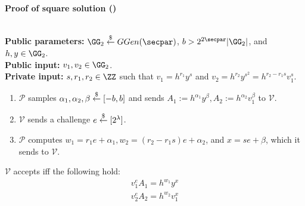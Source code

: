     \begin{mdframed}
    \begin{center}
        \textbf{Proof of square solution (\zkposqs)}
    \end{center}
    \hfill\\
    \textbf{Public parameters:} $\GG_2 \sample GGen(\secpar)$, $b > 2^{2\secpar}\sizeof{\GG_2}$, and $h,y \in \GG_2$. \hfill\\
    \textbf{Public input:} $v_1, v_2 \in \GG_2$. \hfill\\
    \textbf{Private input:} $s, r_1, r_2 \in \ZZ$ such that $v_1 = h^{r_1} y^s$ and $v_2 = h^{r_2} y^{s^2} = h^{r_2 - r_1 s} v_1^s$.
    \begin{enumerate}
        \item $\mathcal{P}$ samples $\alpha_1, \alpha_2, \beta \stackrel{\$}{\gets} [-b,b]$ and sends $A_1 := h^{\alpha_1} y^\beta,\allowbreak A_2 := h^{\alpha_2} v_1^\beta$ to $\mathcal{V}$.
        \item $\mathcal{V}$ sends a challenge $e \stackrel{\$}{\gets} [2^\lambda]$. %
        \item $\mathcal{P}$ computes $w_1 = r_1 e + \alpha_1, w_2 = (r_2 - r_1 s)e + \alpha_2$, and $x = s e + \beta$, which it sends to $\mathcal{V}$.
    \end{enumerate}
    $\mathcal{V}$ accepts iff the following hold:
    \begin{align*}
        v_1^e A_1 = h^{w_1} y^x \\
        v_2^e A_2 = h^{w_2} v_1^x
    \end{align*}
    \end{mdframed}
